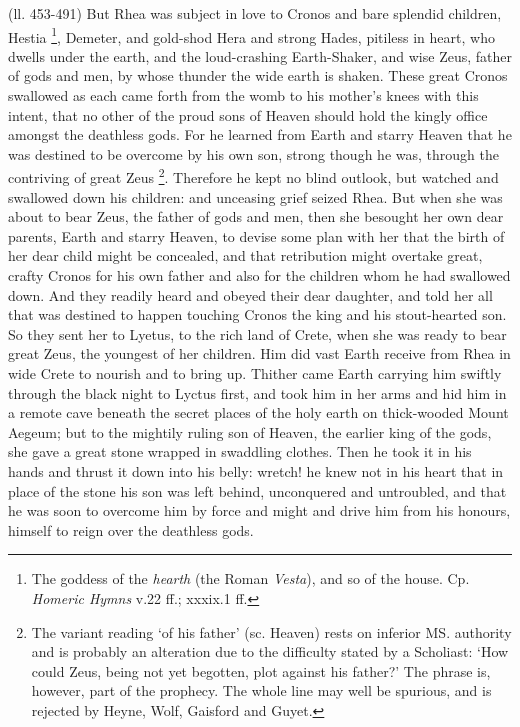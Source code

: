 (ll. 453-491) But Rhea was subject in love to Cronos and bare splendid
children, Hestia \footnote{The goddess of the
\emph{hearth} (the Roman \emph{Vesta}), and so of the house. Cp. \emph{Homeric
Hymns} v.22 ff.; xxxix.1 ff.}, Demeter, and gold-shod Hera and
strong Hades, pitiless in heart, who dwells under the earth, and the
loud-crashing Earth-Shaker, and wise Zeus, father of gods and men, by whose
thunder the wide earth is shaken. These great Cronos swallowed as each came
forth from the womb to his mother’s knees with this intent, that no other
of the proud sons of Heaven should hold the kingly office amongst the deathless
gods. For he learned from Earth and starry Heaven that he was destined to be
overcome by his own son, strong though he was, through the contriving of great
Zeus \footnote{The variant reading
‘of his father’ (sc. Heaven) rests on inferior MS. authority and is
probably an alteration due to the difficulty stated by a Scholiast: ‘How
could Zeus, being not yet begotten, plot against his father?’ The phrase
is, however, part of the prophecy. The whole line may well be spurious, and is
rejected by Heyne, Wolf, Gaisford and Guyet.}. Therefore he kept no blind
outlook, but watched and swallowed down his children: and unceasing grief
seized Rhea. But when she was about to bear Zeus, the father of gods and men,
then she besought her own dear parents, Earth and starry Heaven, to devise some
plan with her that the birth of her dear child might be concealed, and that
retribution might overtake great, crafty Cronos for his own father and also for
the children whom he had swallowed down. And they readily heard and obeyed
their dear daughter, and told her all that was destined to happen touching
Cronos the king and his stout-hearted son. So they sent her to Lyetus, to the
rich land of Crete, when she was ready to bear great Zeus, the youngest of her
children. Him did vast Earth receive from Rhea in wide Crete to nourish and to
bring up. Thither came Earth carrying him swiftly through the black night to
Lyctus first, and took him in her arms and hid him in a remote cave beneath the
secret places of the holy earth on thick-wooded Mount Aegeum; but to the
mightily ruling son of Heaven, the earlier king of the gods, she gave a great
stone wrapped in swaddling clothes. Then he took it in his hands and thrust it
down into his belly: wretch! he knew not in his heart that in place of the
stone his son was left behind, unconquered and untroubled, and that he was soon
to overcome him by force and might and drive him from his honours, himself to
reign over the deathless gods.

